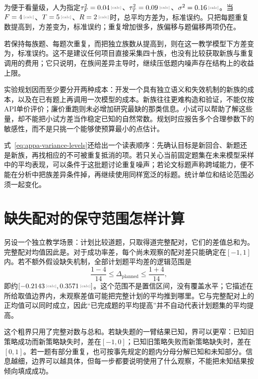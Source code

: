 为便于看量级，人为指定$\tau_F^2=\calcnum{0.04}$、$\tau_T^2=\calcnum{0.09}$、$\sigma^2=\calcnum{0.16}$。当$F=\calcnum{4}$、$T=\calcnum{5}$、$R=\calcnum{2}$时，总平均方差为，标准误约。只把每题重复数提高到，方差变为，标准误约；重复增加很多，族偏移与题偏移两项仍在。

若保持每族题、每题次重复，而把独立族数从提高到，则在这一教学模型下方差变为，标准误约。这不是建议任何项目直接采集四十族，也没有比较获取新族与重复调用的费用；它只说明，在族间差异主导时，继续压低题内噪声存在结构上的收益上限。

实验规划因而至少要分开两种成本：开发一个具有独立语义和失效机制的新族的成本，以及在已有题上再调用一次模型的成本。新族往往更难构造和验证，不能仅按API单价评价；廉价重跑则未必增加研究最缺的那类信息。小试可以帮助了解这些量，却不能把小试方差当作稳定已知的自然常数。规划时应报告多个合理参数下的敏感性，而不是只挑一个能够使预算最小的点估计。

式~\eqref{eq:appa-variance-levels}还给出一个读表顺序：先确认目标是新回合、新题还是新族，再找相应的不可被重复抵消的项。若只关心当前固定题集在未来模型采样中的平均表现，可以条件于这批题讨论重复噪声；若论文标题声称跨域能力，便不能在分析中把族差异条件掉，再继续使用同样宽泛的标题。统计单位和结论范围必须一起变化。

\section{缺失配对的保守范围怎样计算}

另设一个独立教学场景：计划比较道题，只取得道完整配对，它们的差值总和为。完整配对均值因此是。对于成功率差，每个尚未观察的配对差只能确定在$[-1,1]$内。若不额外假设缺失机制，全部计划题平均差的逻辑范围是
\begin{equation}
 \frac{1-4}{14}\le\Delta_{\mathrm{planned}}
 \le\frac{1+4}{14},
\end{equation}
即约$[\calcnum{-0.2143},\calcnum{0.3571}]$。这个范围不是置信区间，没有覆盖水平；它描述在所给取值边界内，未观察差值可能把完整计划的平均推到哪里。它与完整配对上的正均值可以同时成立，因此“已完成题的平均提高”并不自动代表计划题集的平均提高。

这个粗界只用了完整对数与总和。若缺失题的一臂结果已知，界可以更窄：已知旧策略成功而新策略缺失时，差在$[-1,0]$；已知旧策略失败而新策略缺失时，差在$[0,1]$。若一题有部分重复，也可按事先规定的题内分母分解已知和未知部分。信息越细，边界可以越具体，但每一步都要说明使用了什么观察，不能把未知结果按倾向填成成功。

